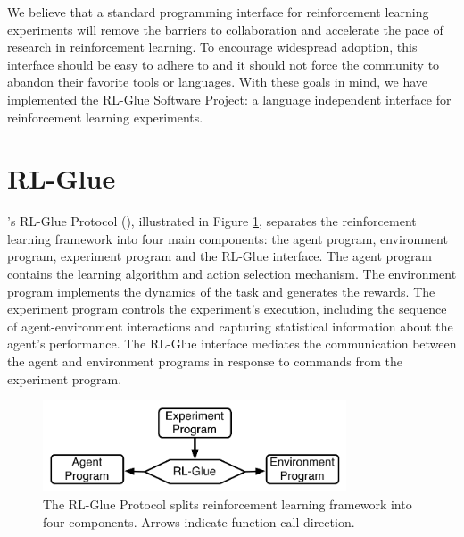 \documentclass[twoside,11pt]{article}
\begin{document}
We believe that a standard programming interface for reinforcement learning experiments will remove the barriers to collaboration and accelerate the pace of research in reinforcement learning.  To encourage widespread adoption, this interface should be easy to adhere to and it should not force the community to abandon their favorite tools or languages.  With these goals in mind, we have implemented the RL-Glue Software Project: a language independent interface for reinforcement learning experiments.





	 

\section{RL-Glue}


\citeauthor{whiteThesis}'s RL-Glue Protocol (\citeyear{whiteThesis}), illustrated in Figure \ref{fig:RLDIA}, separates the reinforcement learning framework into four main components: the agent program, environment program, experiment program and the RL-Glue interface. The agent program contains the learning algorithm and action selection mechanism. The environment program implements the dynamics of the task and generates the rewards. The experiment program controls the experiment's execution, including the sequence of agent-environment interactions and capturing statistical information about the agent's performance.  The RL-Glue interface mediates the communication between the agent and environment programs in response to commands from the experiment program. 

\begin{figure}[ht]
\begin{center}
\includegraphics[width=9cm]{glue.pdf}
\vspace{-0.2cm}
\caption{\small The RL-Glue Protocol splits reinforcement learning framework into four components.  Arrows indicate function call direction.}\label{fig:RLDIA}
\end{center}
\vspace{-0.4cm}
\end{figure}
\end{document}
